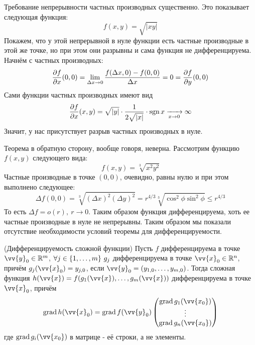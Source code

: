 \begin{example}
	Требование непрерывности частных производных существенно. Это показывает следующая функция:
	\[
		f(x, y) = \sqrt{|xy|}
	\]
	Покажем, что у этой непрерывной в нуле функции есть частные производные в этой же точке, но при этом они разрывны и сама функция не дифференцируема. Начнём с частных производных:
	\[
		\frac{\partial f}{\partial x}(0, 0) = \lim\limits_{\Delta x \to 0} \frac{f(\Delta x, 0) - f(0, 0)}{\Delta x} = 0 = \frac{\partial f}{\partial y}(0, 0)
	\]
	Сами функции частных производных имеют вид
	\[
		\frac{\partial f}{\partial x}(x, y) = \sqrt{|y|} \cdot \frac{1}{2\sqrt{|x|}} \cdot \operatorname{sgn}{x} \xrightarrow[x \to 0]{} \infty
	\]
	Значит, у нас присутствует разрыв частных производных в нуле.
\end{example}

\begin{example}
	Теорема в обратную сторону, вообще говоря, неверна. Рассмотрим функцию $f(x, y)$ следующего вида:
	\[
		f(x, y) = \sqrt[3]{x^2 y^2}
	\]
	Частные производные в точке $(0, 0)$, очевидно, равны нулю и при этом выполнено следующее:
	\[
		\Delta f(0, 0) = \sqrt[3]{(\Delta x)^2 (\Delta y)^2} = r^{4/3} \sqrt[3]{\cos^2 \phi \sin^2 \phi} \le r^{4/3}
	\]
	То есть $\Delta f = o(r),\ r \to 0$. Таким образом функция дифференцируема, хоть ее частные производные в нуле не непрерывны. Таким образом мы показали отсутствие необходимости условий теоремы для дифференцируемости.
\end{example}

\begin{theorem} (Дифференцируемость сложной функции)
	Пусть $f$ дифференцируема в точке $\vv{y}_0 \in \R^m$, $\forall j \in \range{m}\ g_j$ дифференцируема в точке $\vv{x}_0 \in \R^n$, причём $g_j(\vv{x}_0) = y_{j, 0}$, если $\vv{y}_0 = (y_{1, 0}, \ldots, y_{m, 0})$. Тогда сложная функция $h(\vv{x}) = f(g_1(\vv{x}), \ldots, g_m(\vv{x}))$ дифференцируема в точке $\vv{x}_0$, причём
	\[
		\grad h(\vv{x}_0) = \grad f(\vv{y}_0) \begin{pmatrix}
			\grad g_1(\vv{x_0})\\
			\vdots\\
			\grad g_n(\vv{x_0})
		\end{pmatrix}
	\]
	где $\grad g_i(\vv{x_0})$ в матрице - её строки, а не элементы.
\end{theorem}

